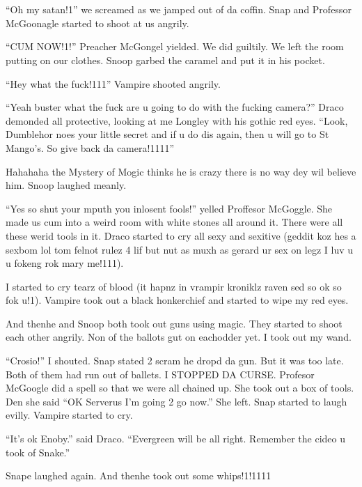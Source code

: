 \section{}



\enquote{Oh my satan!1} we screamed as we jamped out of da coffin. Snap and Professor McGoonagle started to shoot at us angrily.

\enquote{CUM NOW!1!} Preacher McGongel yielded. We did guiltily. We left the room putting on our clothes. Snoop garbed the caramel and put it in his pocket.

\enquote{Hey what the fuck!111} Vampire shooted angrily.

\enquote{Yeah buster what the fuck are u going to do with the fucking camera?} Draco demonded all protective, looking at me Longley with his gothic red eyes. \enquote{Look, Dumblehor noes your little secret and if u do dis again, then u will go to St Mango's. So give back da camera!1111}

Hahahaha the Mystery of Mogic thinks he is crazy there is no way dey wil believe him. Snoop laughed meanly.

\enquote{Yes so shut your mputh you inlosent fools!} yelled Proffesor McGoggle. She made us cum into a weird room with white stones all around it. There were all these werid tools in it. Draco started to cry all sexy and sexitive (geddit koz hes a sexbom lol tom felnot rulez 4 lif but nut as muxh as gerard ur sex on legz I luv u u fokeng rok mary me!111).

I started to cry tearz of blood (it hapnz in vrampir kroniklz raven sed so ok so fok u!1). Vampire took out a black honkerchief and started to wipe my red eyes.

And then\dotfill\newline he and Snoop both took out guns using magic. They started to shoot each other angrily. Non of the ballots gut on eachodder yet. I took out my wand.

\enquote{Crosio!} I shouted. Snap stated 2 scram he dropd da gun. But it was too late. Both of them had run out of ballets. I STOPPED DA CURSE\@. Profesor McGoogle did a spell so that we were all chained up. She took out a box of tools. Den she said \enquote{OK Serverus I'm going 2 go now.} She left. Snap started to laugh evilly. Vampire started to cry.

\enquote{It's ok Enoby.} said Draco. \enquote{Evergreen will be all right. Remember the cideo u took of Snake.}

Snape laughed again. And then\dotfill\newline he took out some whips!1!1111
